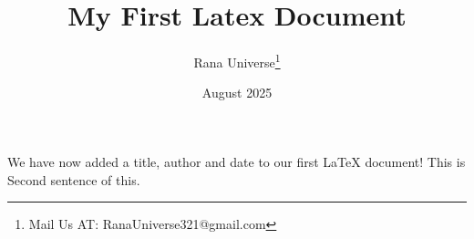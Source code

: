 \documentclass[12pt, letterpaper]{article}
\title{My First Latex Document}
\author{Rana Universe\thanks{Mail Us AT: RanaUniverse321@gmail.com}}
\date{August 2025}
\begin{document}
\maketitle

We have now added a title, author and date to our first \LaTeX{} document!
This is Second sentence of this.

\end{document}
